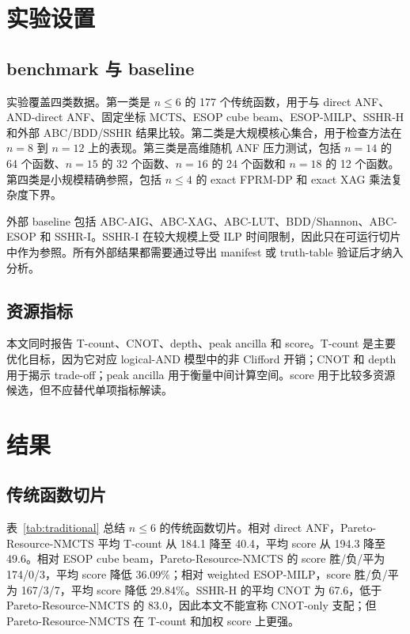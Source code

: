 \documentclass[UTF8,fontset=macnew,11pt]{ctexart}
\newcommand{\pareto}{Pareto-Resource-NMCTS}
\begin{document}
\section{实验设置}

\subsection{benchmark 与 baseline}

实验覆盖四类数据。第一类是 $n\leq 6$ 的 177 个传统函数，用于与 direct ANF、AND-direct ANF、固定坐标 MCTS、ESOP cube beam、ESOP-MILP、SSHR-H 和外部 ABC/BDD/SSHR 结果比较。第二类是大规模核心集合，用于检查方法在 $n=8$ 到 $n=12$ 上的表现。第三类是高维随机 ANF 压力测试，包括 $n=14$ 的 64 个函数、$n=15$ 的 32 个函数、$n=16$ 的 24 个函数和 $n=18$ 的 12 个函数。第四类是小规模精确参照，包括 $n\leq 4$ 的 exact FPRM-DP 和 exact XAG 乘法复杂度下界。

外部 baseline 包括 ABC-AIG、ABC-XAG、ABC-LUT、BDD/Shannon、ABC-ESOP 和 SSHR-I。SSHR-I 在较大规模上受 ILP 时间限制，因此只在可运行切片中作为参照。所有外部结果都需要通过导出 manifest 或 truth-table 验证后才纳入分析。

\subsection{资源指标}

本文同时报告 T-count、CNOT、depth、peak ancilla 和 score。T-count 是主要优化目标，因为它对应 logical-AND 模型中的非 Clifford 开销；CNOT 和 depth 用于揭示 trade-off；peak ancilla 用于衡量中间计算空间。score 用于比较多资源候选，但不应替代单项指标解读。

\section{结果}

\subsection{传统函数切片}

表~\ref{tab:traditional} 总结 $n\leq 6$ 的传统函数切片。相对 direct ANF，\pareto{} 平均 T-count 从 184.1 降至 40.4，平均 score 从 194.3 降至 49.6。相对 ESOP cube beam，\pareto{} 的 score 胜/负/平为 174/0/3，平均 score 降低 36.09\%；相对 weighted ESOP-MILP，score 胜/负/平为 167/3/7，平均 score 降低 29.84\%。SSHR-H 的平均 CNOT 为 67.6，低于 \pareto{} 的 83.0，因此本文不能宣称 CNOT-only 支配；但 \pareto{} 在 T-count 和加权 score 上更强。
\end{document}
